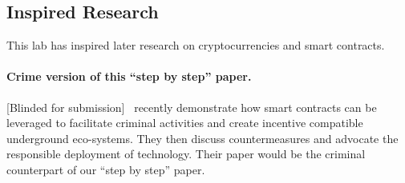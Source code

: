 \documentclass{llncs}
\newcommand{\ignore}[1]{}
\begin{document}
\subsection{Inspired Research}
This lab has inspired later research 
on cryptocurrencies and smart contracts.

\paragraph{Crime version of this ``step by step'' paper.}
[Blinded for submission]~\cite{crime} recently 
demonstrate how smart contracts can be leveraged to facilitate 
criminal activities 
and create incentive compatible underground eco-systems.
They then discuss countermeasures and advocate the responsible deployment
of technology. 
Their paper would be the criminal counterpart  
of our ``step by step'' paper.




\ignore{
Our lab exposed numerous pitfalls of programming  
in the smart contract model of execution.
This inspired our ongoing research 
where we design new programming languages that facilitate
non-specialist programmers 
to develop safe cryptocurrency contracts~\cite{hawk}.
In particular, our new programming languages will aim to 
1) remove the burden of implementing and optimizing cryptography
from  the programmer;
and 
2) offer tools to formally reason about the safety of contracts. 
}










\end{document}

